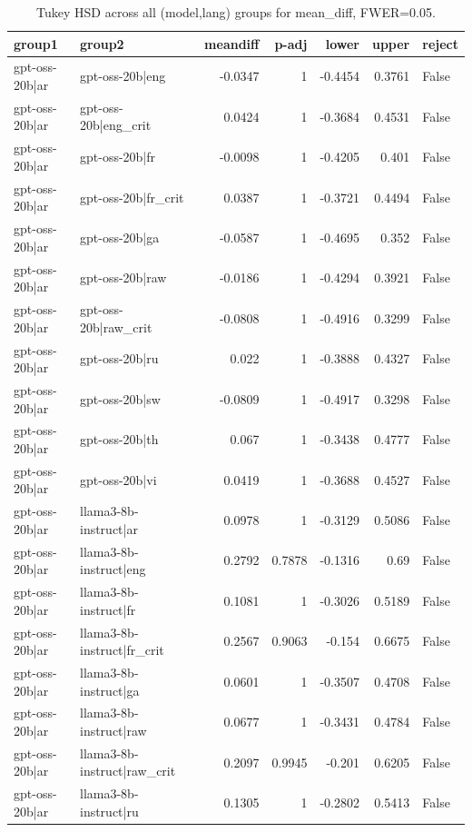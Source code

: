 \begin{table}
\caption{Tukey HSD across all (model,lang) groups for mean_diff, FWER=0.05.}
\label{tab:tukey_all_models_all_langs_mean_diff}
\begin{tabular}{l l r r r r l}
\toprule
group1 & group2 & meandiff & p-adj & lower & upper & reject \\
\midrule
gpt-oss-20b|ar & gpt-oss-20b|eng & -0.0347 & 1 & -0.4454 & 0.3761 & False \\
gpt-oss-20b|ar & gpt-oss-20b|eng_crit & 0.0424 & 1 & -0.3684 & 0.4531 & False \\
gpt-oss-20b|ar & gpt-oss-20b|fr & -0.0098 & 1 & -0.4205 & 0.401 & False \\
gpt-oss-20b|ar & gpt-oss-20b|fr_crit & 0.0387 & 1 & -0.3721 & 0.4494 & False \\
gpt-oss-20b|ar & gpt-oss-20b|ga & -0.0587 & 1 & -0.4695 & 0.352 & False \\
gpt-oss-20b|ar & gpt-oss-20b|raw & -0.0186 & 1 & -0.4294 & 0.3921 & False \\
gpt-oss-20b|ar & gpt-oss-20b|raw_crit & -0.0808 & 1 & -0.4916 & 0.3299 & False \\
gpt-oss-20b|ar & gpt-oss-20b|ru & 0.022 & 1 & -0.3888 & 0.4327 & False \\
gpt-oss-20b|ar & gpt-oss-20b|sw & -0.0809 & 1 & -0.4917 & 0.3298 & False \\
gpt-oss-20b|ar & gpt-oss-20b|th & 0.067 & 1 & -0.3438 & 0.4777 & False \\
gpt-oss-20b|ar & gpt-oss-20b|vi & 0.0419 & 1 & -0.3688 & 0.4527 & False \\
gpt-oss-20b|ar & llama3-8b-instruct|ar & 0.0978 & 1 & -0.3129 & 0.5086 & False \\
gpt-oss-20b|ar & llama3-8b-instruct|eng & 0.2792 & 0.7878 & -0.1316 & 0.69 & False \\
gpt-oss-20b|ar & llama3-8b-instruct|fr & 0.1081 & 1 & -0.3026 & 0.5189 & False \\
gpt-oss-20b|ar & llama3-8b-instruct|fr_crit & 0.2567 & 0.9063 & -0.154 & 0.6675 & False \\
gpt-oss-20b|ar & llama3-8b-instruct|ga & 0.0601 & 1 & -0.3507 & 0.4708 & False \\
gpt-oss-20b|ar & llama3-8b-instruct|raw & 0.0677 & 1 & -0.3431 & 0.4784 & False \\
gpt-oss-20b|ar & llama3-8b-instruct|raw_crit & 0.2097 & 0.9945 & -0.201 & 0.6205 & False \\
gpt-oss-20b|ar & llama3-8b-instruct|ru & 0.1305 & 1 & -0.2802 & 0.5413 & False \\

\end{tabular}
\end{table}
